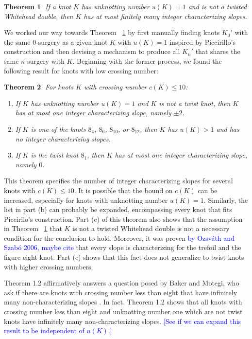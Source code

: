 \documentclass[11pt,usenames,dvipsnames,reqno]{amsart}
\newtheorem{theorem}{Theorem}
\numberwithin{theorem}{section}
\theoremstyle{ex}
\theoremstyle{rem}
\def\kh#1{\textcolor{Blue}{#1}}
\begin{document}
\begin{theorem}\label{thm:unknotting-one} If a knot $K$ has unknotting number $u(K)=1$ and is not a twisted Whitehead double, then $K$ has at most finitely many integer characterizing slopes.
\end{theorem}

We worked our way towards Theorem ~\ref{thm:unknotting-one} by first manually finding knots $K_{0}'$ with the same $0$-surgery as a given knot $K$ with $u(K)=1$ inspired by Piccirillo's construction and then devising a mechanism to produce all $K_n'$ that shares the same $n$-surgery with $K$. Beginning with the former process, we found the following result for knots with low crossing number:

\begin{theorem}\label{thm:low-crossing} For knots $K$ with crossing number $c(K) \leq 10$:
	\begin{enumerate}[label=\normalfont \bf (\alph*)]
		\item If $K$ has unknotting number $u(K)=1$ and $K$ is not a twist knot, then $K$ has at most one integer characterizing slope, namely $\pm 2$.
		\item If $K$ is one of the knots $8_4$, $8_6$, $8_{10}$, or $8_{12}$, then $K$ has $u(K)>1$ and has no integer characterizing slopes.
		\item If $K$ is the twist knot $8_1$, then $K$ has at most one integer characterizing slope, namely $0$.
	\end{enumerate}
\end{theorem}

This theorem specifies the number of integer characterizing slopes for several knots with $c(K) \leq 10$. It is possible that the bound on $c(K)$ can be increased, especially for knots with unknotting number $u(K) = 1$. Similarly, the list in part (b) can probably be expanded, encompassing every knot that fits Piccirilo's construction. Part (c) of this theorem also shows that the assumption in Theorem ~\ref{thm:unknotting-one} that $K$ is not a twisted Whitehead double is not a necessary condition for the conclusion to hold. Moreover, it was proven \kh{by Ozsv\'{a}th and Szab\'{o} 2006, maybe cite}  that every slope is characterizing for the trefoil and the figure-eight knot. Part (c) shows that this fact does not generalize to twist knots with higher crossing numbers.

Theorem 1.2 affirmatively answers a question posed by Baker and Motegi, who ask if there are knots with crossing number less than eight that have infinitely many non-characterizing slopes \cite[Question~1.7]{baker-motegi}. In fact, Theorem 1.2 shows that all knots with crossing number less than eight and unknotting number one which are not twist knots have infinitely many non-characterizing slopes. \kh{[See if we can expand this result to be independent of $u(K)$.]}
\end{document}

